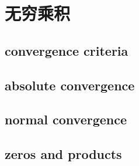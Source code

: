\section{无穷乘积}
\label{b3:sec:2001}


\subsection{convergence criteria}
\label{b3:subsec:200101}

\subsection{absolute convergence}
\label{b3:subsec:200102}

\subsection{normal convergence}
\label{b3:subsec:200103}

\subsection{zeros and products}
\label{b3:subsec:200104}


